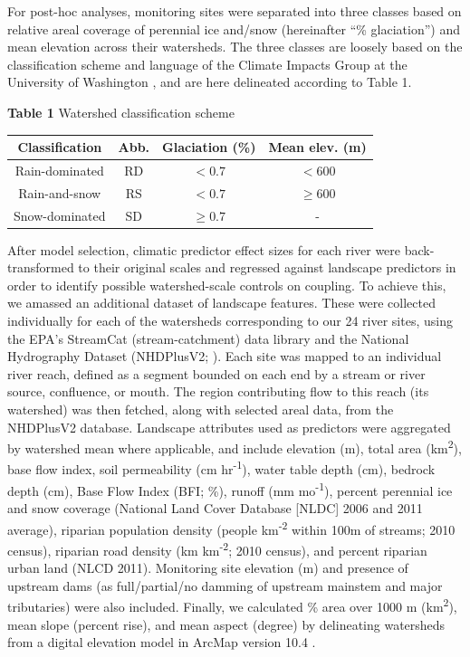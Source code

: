 \documentclass[notitlepage]{article}
\begin{document}
For post-hoc analyses, monitoring sites were separated into three classes based on relative areal coverage of perennial ice and/snow (hereinafter ``\% glaciation'') and mean elevation across their watersheds. The three classes are loosely based on the classification scheme and language of the Climate Impacts Group at the University of Washington \citep{mauger2015CIG}, and are here delineated according to Table 1.

\begin{center}
\textbf{Table 1} Watershed classification scheme
\end{center}
\begin{center}
\begin{tabular}{ |c|c|c|c| }
 \hline
 Classification & Abb. & Glaciation (\%) & Mean elev. (m) \\
 \hline
 Rain-dominated & RD & $< 0.7$ & $< 600$ \\
 Rain-and-snow & RS & $< 0.7$ & $\geq 600$ \\
 Snow-dominated & SD & $\geq 0.7$ & - \\
 \hline
\end{tabular}
\end{center}

After model selection, climatic predictor effect sizes for each river were back-transformed to their original scales and regressed against landscape predictors in order to identify possible watershed-scale controls on coupling. To achieve this, we amassed an additional dataset of landscape features. These were collected individually for each of the watersheds corresponding to our 24 river sites, using the EPA's StreamCat (stream-catchment) data library \citep{hill2016stream} and the National Hydrography Dataset (NHDPlusV2; \citealt{mckay2012nhdplus}). Each site was mapped to an individual river reach, defined as a segment bounded on each end by a stream or river source, confluence, or mouth. The region contributing flow to this reach (its watershed) was then fetched, along with selected areal data, from the NHDPlusV2 database. Landscape attributes used as predictors were aggregated by watershed mean where applicable, and include elevation (m), total area (km\textsuperscript{2}), base flow index, soil permeability (cm hr\textsuperscript{-1}), water table depth (cm), bedrock depth (cm), Base Flow Index (BFI; \%), runoff (mm mo\textsuperscript{-1}), percent perennial ice and snow coverage (National Land Cover Database [NLDC] 2006 and 2011 average), riparian population density (people km\textsuperscript{-2} within 100m of streams; 2010 census), riparian road density (km km\textsuperscript{-2}; 2010 census), and percent riparian urban land (NLCD 2011). Monitoring site elevation (m) and presence of upstream dams (as full/partial/no damming of upstream mainstem and major tributaries) were also included. Finally, we calculated \% area over 1000 m (km\textsuperscript{2}), mean slope (percent rise), and mean aspect (degree) by delineating watersheds from a digital elevation model in ArcMap version 10.4 \citep{arcviewenvironmental}.
\end{document}
